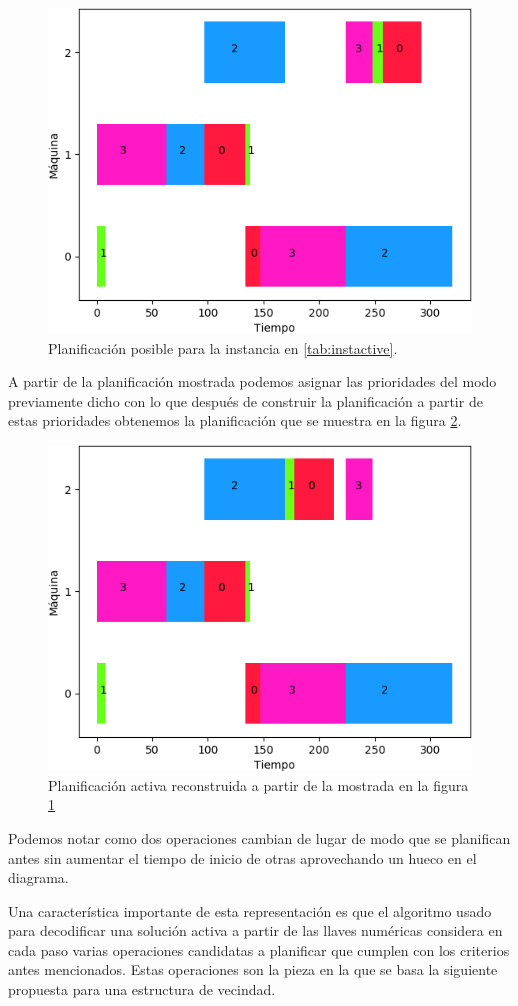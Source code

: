 \begin{figure}[H]
     \centering
     \includegraphics[scale=.7]{Imagenes/ganttnonactivepr.png}
     \caption{Planificación posible para la instancia en \ref{tab:instactive}. }
     \label{fig:nonactivepr}
\end{figure}
A partir de la planificación mostrada podemos asignar las prioridades del modo previamente dicho con lo que después de construir la planificación a partir de estas prioridades obtenemos la planificación que se muestra en la figura \ref{fig:activepr}.
\begin{figure}[H]
     \centering
     \includegraphics[scale=.7]{Imagenes/ganttactivepr.png}
     \caption{Planificación activa reconstruida a partir de la mostrada en la figura \ref{fig:nonactivepr}}
     \label{fig:activepr}
\end{figure}

Podemos notar como dos operaciones cambian de lugar de modo que se planifican antes sin aumentar el tiempo de inicio de otras aprovechando un hueco en el diagrama.

Una característica importante de esta representación es que el algoritmo usado para decodificar una solución activa a partir de las llaves numéricas considera en cada paso varias operaciones candidatas a planificar que cumplen con los criterios antes mencionados. Estas operaciones son la pieza en la que se basa la siguiente propuesta para una estructura de vecindad.
